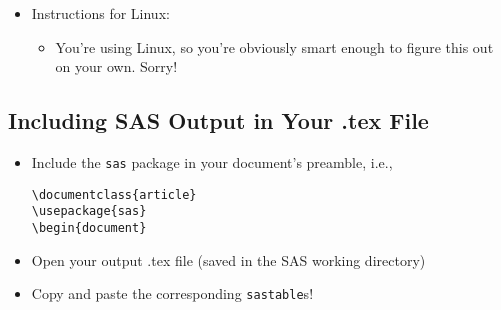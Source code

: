 \documentclass{article}
\begin{document}
\begin{itemize}
\begin{itemize}
			\item (This was copied verbatim from StackExchange: \href{http://tex.stackexchange.com/a/10256}{http://tex.stackexchange.com/a/10256}) (Disclaimer: I do not use OS X, so no guarantees that this works.)
			\item Essentially, put \texttt{sas.sty} in /Library/texmf. 
		\end{itemize}
		\item Instructions for Linux:
		\begin{itemize}
			\item You're using Linux, so you're obviously smart enough to figure this out on your own. Sorry!
		\end{itemize}
	\end{itemize}
	
	\subsection{Including SAS Output in Your .tex File}
	\begin{itemize}
		\item Include the \texttt{sas} package in your document's preamble, i.e.,
		\begin{verbatim}
\documentclass{article}
\usepackage{sas}
\begin{document}
		\end{verbatim}
		\item Open your output .tex file (saved in the SAS working directory)
		\item Copy and paste the corresponding \texttt{sastable}s!
	\end{itemize}
	
\end{document}
